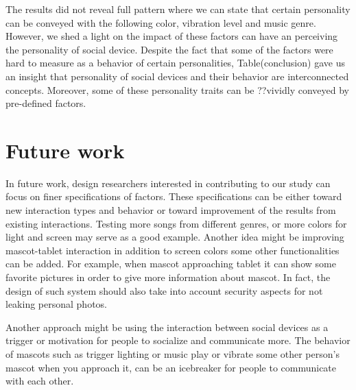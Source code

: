 \par The results did not reveal full pattern where we can state that certain personality
can be conveyed with the following color, vibration level and music genre.
However, we shed a light on the impact of these factors can have an perceiving the personality of social device.
Despite the fact that some of the factors were hard to measure as a behavior of certain personalities,
Table(conclusion) gave us an insight that personality of social devices and their behavior
are interconnected concepts.
Moreover, some of these personality traits can be ??vividly conveyed by pre-defined factors.


\section{Future work}
\label{sec:future-work}
\par In future work, design researchers interested in contributing to our study can focus
on finer specifications of factors.
These specifications can be either toward new interaction types and behavior or toward
improvement of the results from existing interactions.
Testing more songs from different genres, or more colors for light and screen may serve as a good example.
Another idea might be improving mascot-tablet interaction in addition to screen colors
some other functionalities can be added.
For example, when mascot approaching tablet it can show some favorite pictures in order
to give more information about mascot.
In fact, the design of such system should also take into account security aspects for not leaking personal photos.

\par Another approach might be using the interaction between social devices as a trigger or
motivation for people to socialize and communicate more.
The behavior of mascots such as trigger lighting or music play or vibrate some other
person’s mascot when you approach it, can be an icebreaker for people to communicate with each other.